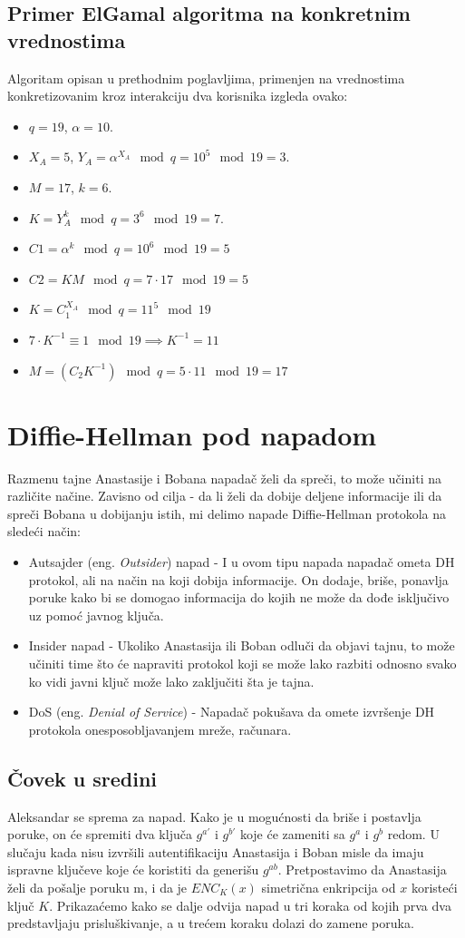 \documentclass[a4paper]{article}
\begin{document}
\subsection{Primer ElGamal algoritma na konkretnim vrednostima}
Algoritam opisan u prethodnim poglavljima, primenjen na vrednostima konkretizovanim kroz interakciju dva korisnika izgleda ovako:
\begin{itemize}
  \item $q=19$, $\alpha=10$. 
  \item $X_A=5$, $Y_A=\alpha^{X_A}\mod q=10^5\mod 19=3$.
  \item $M=17$, $k=6$.
  \item $K=Y_A^k\mod q=3^6\mod 19=7$.
  \item $C1=\alpha^k \mod q=10^6\mod 19=5$
  \item $C2=KM\mod q=7\cdot17\mod 19=5$
  \item $K=C_1^{X_A}\mod q=11^5\mod 19$
  \item $7\cdot K^{-1} \equiv 1 \mod 19 \implies K^{-1}=11$
  \item $M=(C_2K^{-1})\mod q=5\cdot 11 \mod 19=17$
\end{itemize}

\section{Diffie-Hellman pod napadom}
Razmenu tajne Anastasije i Bobana napadač želi da spreči, to može učiniti na različite načine. Zavisno od cilja - da li želi da dobije deljene informacije ili da spreči Bobana u dobijanju istih, mi delimo napade Diffie-Hellman protokola na sledeći način:
\begin{itemize}
\item Autsajder (eng. \emph{Outsider}) napad - I u ovom tipu napada napadač ometa DH protokol, ali na način na koji dobija informacije. On dodaje, briše, ponavlja poruke kako bi se domogao informacija do kojih ne može da dođe isključivo uz pomoć javnog ključa.
\item Insider napad - Ukoliko Anastasija ili Boban odluči da objavi tajnu, to može učiniti time što će napraviti protokol koji se može lako razbiti odnosno svako ko vidi javni ključ može lako zaključiti šta je tajna.
\item DoS (eng. \emph{Denial of Service}) - Napadač pokušava da omete izvršenje DH protokola onesposobljavanjem mreže, računara. \cite{dhpaper}
\end{itemize}


\subsection{Čovek u sredini}
Aleksandar se sprema za napad. Kako je u mogućnosti da briše i postavlja poruke, on će spremiti dva ključa $g^{a'}$ i $g^{b'}$ koje će zameniti sa $g^{a}$ i $g^{b}$ redom. U slučaju kada nisu izvršili autentifikaciju Anastasija i Boban misle da imaju ispravne ključeve koje će koristiti da generišu $g^{ab}$. Pretpostavimo da Anastasija želi da pošalje poruku m, i da je $ENC_{K}(x)$ simetrična enkripcija od $x$ koristeći ključ $K$. Prikazaćemo kako se dalje odvija napad u tri koraka od kojih prva dva predstavljaju prisluškivanje, a u trećem koraku dolazi do zamene poruka.
\end{document}
